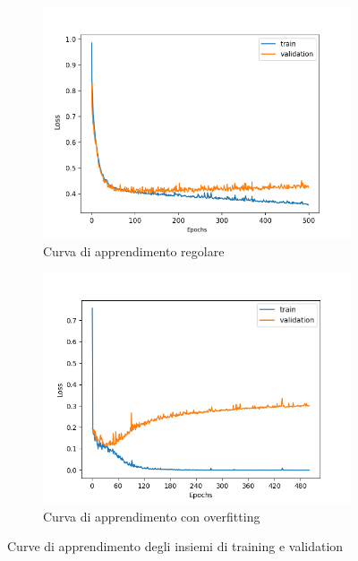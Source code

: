 \documentclass[12pt, twoside, letterpaper]{report}
\begin{document}
				\begin{figure}
				\begin{subfigure}[]{.5\textwidth}
					\centering
					\includegraphics[width=\linewidth]{learning_curve.png}
					\caption{Curva di apprendimento regolare}
					\label{fig:learning_curve}
				\end{subfigure}
				\hfill
				\begin{subfigure}[]{.5\textwidth}
					\centering
					\includegraphics[width=\linewidth]{overfitting.png}
					\caption{Curva di apprendimento con overfitting}
					\label{fig:overfitting}
				\end{subfigure}
				
				\caption{Curve di apprendimento degli insiemi di training e validation}
				\label{fig:curve_di_apprendimento}
				\end{figure}
				
\end{document}
